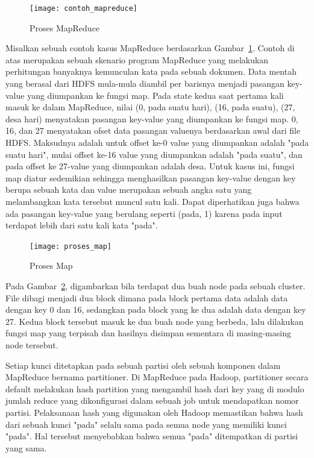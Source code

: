 \begin{figure}[H]
\centering
\texttt{[image: contoh\_mapreduce]}
\caption[Proses MapReduce]{Proses MapReduce}
\label{fig:Proses MapReduce}
\end{figure}

Misalkan sebuah contoh kasus MapReduce berdasarkan Gambar~\ref{fig:Proses MapReduce}. Contoh di atas merupakan sebuah skenario program MapReduce yang melakukan perhitungan banyaknya kemunculan kata pada sebuah dokumen. Data mentah yang berasal dari HDFS mula-mula diambil per barisnya menjadi pasangan key-value yang diumpankan ke fungsi map. Pada state kedua saat pertama kali masuk ke dalam MapReduce, nilai (0, pada suatu hari), (16, pada suatu), (27, desa hari) menyatakan pasangan key-value yang diumpankan ke fungsi map. 0, 16, dan 27 menyatakan ofset data pasangan valuenya berdasarkan awal dari file HDFS. Maksudnya adalah untuk offset ke-0 value yang diumpankan adalah "pada suatu hari", mulai offset ke-16 value yang diumpankan adalah "pada suatu", dan pada offset ke 27-value yang diumpankan adalah desa. Untuk kasus ini, fungsi map diatur sedemikian sehingga menghasilkan pasangan key-value dengan key berupa sebuah kata dan value merupakan sebuah angka satu yang melambangkan kata tersebut muncul satu kali. Dapat diperhatikan juga bahwa ada pasangan key-value yang berulang seperti (pada, 1) karena pada input terdapat lebih dari satu kali kata "pada".

\begin{figure}[H]
\centering
\texttt{[image: proses\_map]}
\caption[Proses Map]{Proses Map}
\label{fig:Proses Map}
\end{figure}

Pada Gambar~\ref{fig:Proses Map}, digambarkan bila terdapat dua buah node pada sebuah cluster. File dibagi menjadi dua block dimana pada block pertama data adalah data dengan key 0 dan 16, sedangkan pada block yang ke dua adalah data dengan key 27. Kedua block tersebut masuk ke dua buah node yang berbeda, lalu dilakukan fungsi map yang terpisah dan hasilnya disimpan sementara di masing-masing node tersebut.

Setiap kunci ditetapkan pada sebuah partisi oleh sebuah komponen dalam MapReduce bernama partitioner. Di MapReduce pada Hadoop, partitioner secara default melakukan hash partition yang mengambil hash dari key yang di modulo jumlah reduce yang dikonfigurasi dalam sebuah job untuk mendapatkan nomor partisi. Pelaksanaan hash yang digunakan oleh Hadoop memastikan bahwa hash dari sebuah kunci "pada" selalu sama pada semua node yang memiliki kunci "pada". Hal tersebut menyebabkan bahwa semua "pada" ditempatkan di partisi yang sama.

